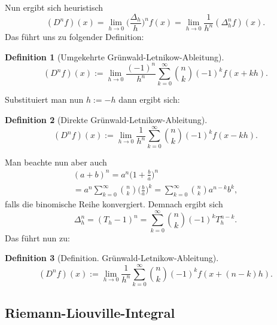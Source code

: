 \documentclass[a4paper,10pt,fleqn,twocolumn,twoside,dvipdfmx]{scrartcl}
\numberwithin{equation}{section}
\theoremstyle{rmbox}
\newtheorem{definition}{Definition}
\begin{document}
Nun ergibt sich heuristisch
\begin{equation}
(D^n f)(x) = \lim_{h\to 0} \bigg(\frac{\Delta_h}{h}\bigg)^n f(x)
= \lim_{h\to 0}\frac{1}{h^n} (\Delta_h^n f)(x).
\end{equation}
Das führt uns zu folgender Definition:
\begin{definition}[Umgekehrte Grünwald-Letnikow-Ableitung]
\begin{equation}
(D^n f)(x) := \lim_{h\to 0}
\frac{(-1)^n}{h^n} \sum_{k=0}^\infty \binom{n}{k} (-1)^k f(x+kh).
\end{equation}
\end{definition}
Substituiert man nun $h:=-h$ dann ergibt sich:
\begin{definition}[Direkte Grünwald-Letnikow-Ableitung]
\begin{equation}
(D^n f)(x) := \lim_{h\to 0}
\frac{1}{h^n} \sum_{k=0}^\infty \binom{n}{k} (-1)^k f(x-kh).
\end{equation}
\end{definition}
Man beachte nun aber auch
\begin{gather}
(a+b)^n = a^n \bigg(1+\frac{b}{a}\bigg)^n\\
= a^n\sum_{k=0}^\infty \binom{n}{k}\bigg(\frac{b}{a}\bigg)^k
= \sum_{k=0}^\infty \binom{n}{k} a^{n-k}b^k,
\end{gather}
falls die binomische Reihe konvergiert. Demnach ergibt sich%
\begin{equation}
\Delta_h^n = (T_h-1)^n = \sum_{k=0}^\infty \binom{n}{k}(-1)^k T_h^{n-k}.
\end{equation}
Das führt nun zu:
\begin{definition}[Definition. Grünwald-Letnikow-Ableitung]
\begin{equation}
(D^n f)(x) := \lim_{h\to 0}
\frac{1}{h^n} \sum_{k=0}^\infty \binom{n}{k} (-1)^k f(x+(n-k)h).
\end{equation}
\end{definition}

\subsection{Riemann-Liouville-Integral}
\end{document}
